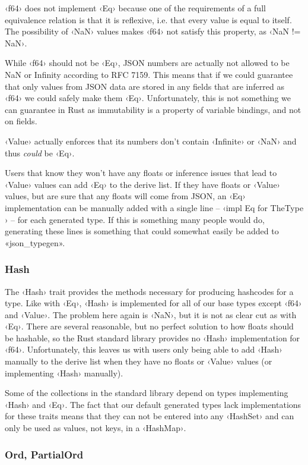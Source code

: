 ‹f64› does not implement ‹Eq› because one of the requirements of a full equivalence relation is that it is reflexive, i.e. that every value is equal to itself. The possibility of ‹NaN› values makes ‹f64› not satisfy this property, as ‹NaN != NaN›.

While ‹f64› should not be ‹Eq›, JSON numbers are actually not allowed to be NaN or Infinity according to RFC 7159\cite[7]{RFC7159}. This means that if we could guarantee that only values from JSON data are stored in any fields that are inferred as ‹f64› we could safely make them ‹Eq›. Unfortunately, this is not something we can guarantee in Rust as immutability is a property of variable bindings, and not on fields.

‹Value› actually enforces that its numbers don't contain ‹Infinite› or ‹NaN› and thus \emph{could} be ‹Eq›.

Users that know they won't have any floats or inference issues that lead to ‹Value› values can add ‹Eq› to the derive list. If they have floats or ‹Value› values, but are sure that any floats will come from JSON, an ‹Eq› implementation can be manually added with a single line -- ‹impl Eq for TheType {}› -- for each generated type. If this is something many people would do, generating these lines is something that could somewhat easily be added to «json_typegen».

\subsubsection{Hash}

The ‹Hash› trait provides the methods necessary for producing hashcodes for a type. Like with ‹Eq›, ‹Hash› is implemented for all of our base types except ‹f64› and ‹Value›. The problem here again is ‹NaN›, but it is not as clear cut as with ‹Eq›. There are several reasonable, but no perfect solution to how floats should be hashable, so the Rust standard library provides no ‹Hash› implementation for ‹f64›. Unfortunately, this leaves us with users only being able to add ‹Hash› manually to the derive list when they have no floats or ‹Value› values (or implementing ‹Hash› manually).

Some of the collections in the standard library depend on types implementing ‹Hash› and ‹Eq›. The fact that our default generated types lack implementations for these traits means that they can not be entered into any ‹HashSet› and can only be used as values, not keys, in a ‹HashMap›.

\subsubsection{Ord, PartialOrd}

